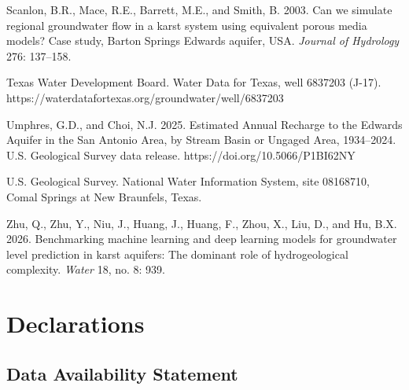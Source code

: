 \documentclass[11pt]{article}
\begin{document}
Scanlon, B.R., Mace, R.E., Barrett, M.E., and Smith, B. 2003. Can we
simulate regional groundwater flow in a karst system using equivalent
porous media models? Case study, Barton Springs Edwards aquifer, USA.
\emph{Journal of Hydrology} 276: 137--158.

Texas Water Development Board. Water Data for Texas, well 6837203
(J-17). https://waterdatafortexas.org/groundwater/well/6837203

Umphres, G.D., and Choi, N.J. 2025. Estimated Annual Recharge to the
Edwards Aquifer in the San Antonio Area, by Stream Basin or Ungaged
Area, 1934--2024. U.S. Geological Survey data release.
https://doi.org/10.5066/P1BI62NY

U.S. Geological Survey. National Water Information System, site
08168710, Comal Springs at New Braunfels, Texas.

Zhu, Q., Zhu, Y., Niu, J., Huang, J., Huang, F., Zhou, X., Liu, D., and
Hu, B.X. 2026. Benchmarking machine learning and deep learning models
for groundwater level prediction in karst aquifers: The dominant role of
hydrogeological complexity. \emph{Water} 18, no. 8: 939.

\section*{Declarations}

\subsection*{Data Availability Statement}
\end{document}
